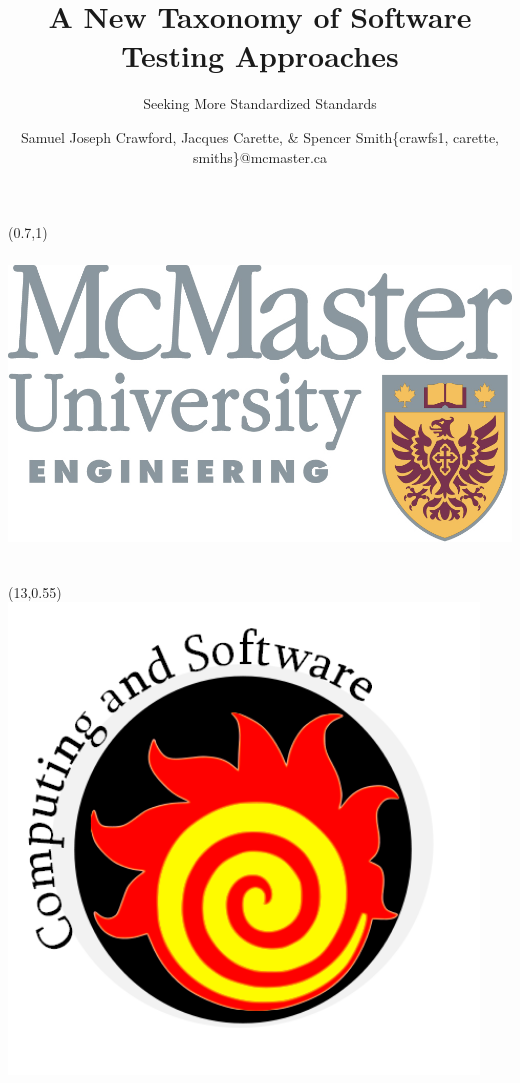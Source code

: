 \documentclass[22pt]{beamer}
\title{A New Taxonomy of Software Testing Approaches}
\subtitle{Seeking More Standardized Standards}
\author[Crawford, Carette, \& Smith]{Samuel Joseph Crawford, Jacques Carette, \& Spencer Smith\newline \small \{crawfs1, carette, smiths\}@mcmaster.ca}
\institute{\fontsize{26}{12}\selectfont April 22, 2023} %
\date{}
\begin{document}

\begin{frame}[fragile]

    \begin{textblock}{2}(0.7,1)
        \includegraphics[height=8.5cm]{eng_logo.png}
    \end{textblock}

    \begin{textblock}{2}(13,0.55)
        \includegraphics[height=12.5cm]{cas_logo.png}
    \end{textblock}


\end{frame}
\end{document}
